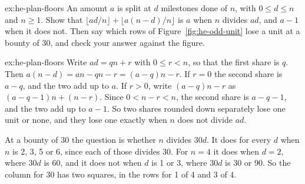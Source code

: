 \documentclass[11pt,a4paper]{article}
\theoremstyle{definition}
\theoremstyle{definition}
\theoremstyle{remark}
\begin{document}
\begin{pdexercise}[kind=Check,rating=2]{ex:he-plan-floors}
An amount $a$ is split at $d$ milestones done of $n$, with $0 \le d \le n$ and $n \ge 1$. Show that $\lfloor ad/n \rfloor + \lfloor a(n-d)/n \rfloor$ is $a$ when $n$ divides $ad$, and $a-1$ when it does not. Then say which rows of Figure~\ref{fig:he-odd-unit} lose a unit at a bounty of 30, and check your answer against the figure.
\end{pdexercise}
\begin{pdsolution}{ex:he-plan-floors}
Write $ad = qn + r$ with $0 \le r < n$, so that the first share is $q$. Then $a(n-d) = an - qn - r = (a-q)n - r$. If $r = 0$ the second share is $a-q$, and the two add up to $a$. If $r > 0$, write $(a-q)n - r$ as $(a-q-1)n + (n-r)$. Since $0 < n-r < n$, the second share is $a-q-1$, and the two add up to $a-1$. So two shares rounded down separately lose one unit or none, and they lose one exactly when $n$ does not divide $ad$.

At a bounty of 30 the question is whether $n$ divides $30d$. It does for every $d$ when $n$ is 2, 3, 5 or 6, since each of those divides 30. For $n = 4$ it does when $d = 2$, where $30d$ is 60, and it does not when $d$ is 1 or 3, where $30d$ is 30 or 90. So the column for 30 has two squares, in the rows for 1 of 4 and 3 of 4.
\end{pdsolution}
\end{document}
